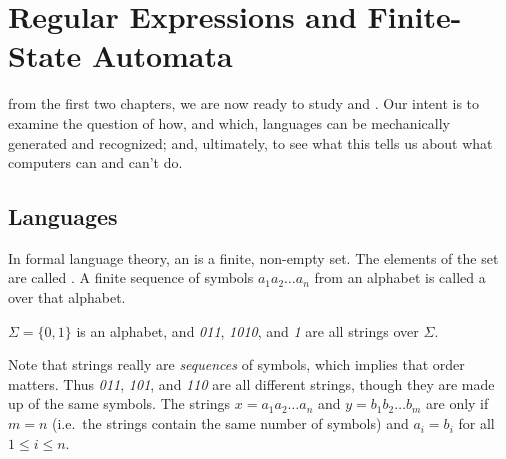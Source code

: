 
\newcommand{\ab}{\mbox{$\{a,b\}$}}
\newcommand{\aetc}[2]{\mbox{{${#1}_1{#1}_2\ldots {#1}_{#2}$}}}
\newcommand{\varep}{\varepsilon}
\newcommand{\fsafig}[1]{\medskip\centerline{\eps{fsa#1}}\medskip}

\newcommand{\REOR}{\hbox{$\,|\,$}}

\chapter[Regular Expressions and FSA's]{Regular Expressions and Finite-State Automata}

from the first two chapters, we
are now ready to study  and .
Our intent is to examine the question of how, and which, languages
can be mechanically generated and recognized; and, ultimately, to see
what this tells us about what computers can and can't do.

\bigskip
\section{Languages}
In formal language theory, an  is a finite, non-empty 
set.  The elements of the set are called .  A finite 
sequence of symbols $a_1a_2\ldots a_n$
from an alphabet is called a  over that alphabet.  

\smallskip

\begin{example}
$\Sigma = \{0,1\}$ is an alphabet, and {\em 011}, 
{\em 1010}, and {\em 1} are all strings over $\Sigma$.
\end{example}

\smallskip

Note that strings really are \emph{sequences} of symbols, which 
implies that 
order matters.  Thus {\em 011}, {\em 101}, and {\em 110} are all 
different strings, though they are made up of the same symbols.
The strings $x=\aetc{a}{n}$ and $y=\aetc{b}{m}$ are  only
if $m=n$ (i.e.\ the strings contain the same number of symbols) and 
$a_i=b_i$ for all
$1 \leq i \leq n$.

